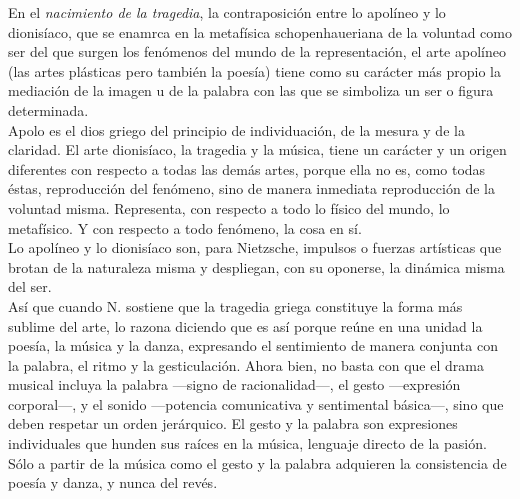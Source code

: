 \documentclass[a4paper, 10pt, twocolumn, spanish]{article}
\begin{document}
En el \emph{nacimiento de la tragedia}, la contraposición entre lo apolíneo
y lo dionisíaco, que se enamrca en la metafísica schopenhaueriana de
la voluntad como ser del que surgen los fenómenos del mundo de la
representación, el arte apolíneo (las artes plásticas pero también la
poesía) tiene como su carácter más propio la mediación de la imagen u
de la palabra con las que se simboliza un ser o figura determinada.\\[0pt]
Apolo es el dios griego del principio de individuación, de la mesura y
de la claridad. El arte dionisíaco, la tragedia y la música, tiene un
carácter y un origen diferentes con respecto a todas las demás artes,
porque ella no es, como todas éstas, reproducción del fenómeno, sino
de manera inmediata reproducción de la voluntad misma. Representa, con
respecto a todo lo físico del mundo, lo metafísico. Y con respecto a
todo fenómeno, la cosa en sí.\\[0pt]
Lo apolíneo y lo dionisíaco son, para Nietzsche, impulsos o fuerzas
artísticas que brotan de la naturaleza misma y despliegan, con su
oponerse, la dinámica misma del ser.\\[0pt]

Así que cuando N. sostiene que la tragedia griega constituye la forma
más sublime del arte, lo razona diciendo que es así porque reúne en
una unidad la poesía, la música y la danza, expresando el sentimiento
de manera conjunta con la palabra, el ritmo y la gesticulación. Ahora
bien, no basta con que el drama musical incluya la palabra —signo de
racionalidad—, el gesto —expresión corporal—, y el sonido —potencia
comunicativa y sentimental básica—, sino que deben respetar un orden
jerárquico. El gesto y la palabra son expresiones individuales que
hunden sus raíces en la música, lenguaje directo de la pasión. Sólo a
partir de la música como el gesto y la palabra adquieren la
consistencia de poesía y danza, y nunca del revés.\\[0pt]
\end{document}
